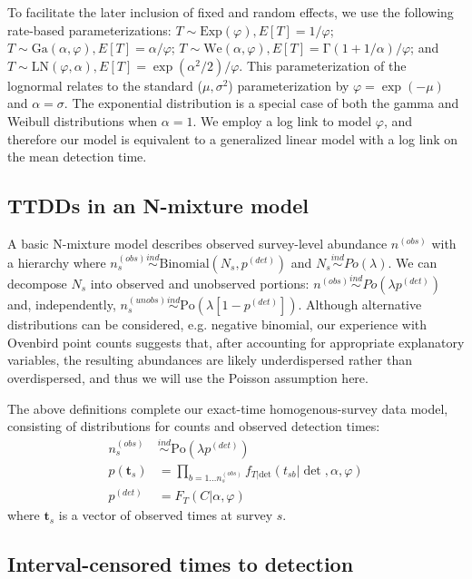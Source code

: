 \documentclass[12pt]{article}
\newcommand{\Exp}{\mbox{Exp}}
\newcommand{\Ga}{\mbox{Ga}}
\newcommand{\We}{\mbox{We}}
\newcommand{\LN}{\mbox{LN}}
\newcommand{\Po}{\mbox{Po}}
\newcommand{\pdet}{p^{(det)}}
\newcommand{\ind}{\stackrel{ind}{\sim}}
\newcommand{\dt}{\text{det}}
\newcommand{\nobs}{n^{(obs)}}
\begin{document}
To facilitate the later inclusion of fixed and random effects, we use the following rate-based parameterizations: $T\sim \Exp(\varphi), E[T]=1/\varphi$; $T\sim \Ga(\alpha,\varphi), E[T] = \alpha/\varphi$; $T\sim \We(\alpha,\varphi), E[T]=\mathrm{\Gamma}(1+1/\alpha)/\varphi$; and $T\sim \LN(\varphi,\alpha), E[T] = \exp(\alpha^2/2)/\varphi$.  
This parameterization of the lognormal relates to the standard ($\mu, \sigma^2$) parameterization by $\varphi = \exp(-\mu)$ and $\alpha = \sigma$.  %
The exponential distribution is a special case of both the gamma and Weibull distributions when $\alpha=1$. 
We employ a log link to model $\varphi$, and therefore our model is equivalent to a generalized linear model with a log link on the mean detection time.

\subsection{TTDDs in an N-mixture model}

A basic N-mixture model describes observed survey-level abundance $\nobs$ with a hierarchy where $\nobs_s \ind \mbox{Binomial}\left(N_{s}, \pdet\right)$ and $N_s \ind Po(\lambda)$.
We can decompose $N_{s}$ into observed and unobserved portions: $\nobs \ind Po(\lambda \pdet)$ and, independently, $n_{s}^{(unobs)} \ind \Po\left(\lambda[1-\pdet]\right)$.
Although alternative distributions can be considered, e.g. negative binomial, our experience with Ovenbird point counts suggests that, after accounting for appropriate explanatory variables, the resulting abundances are likely underdispersed rather than overdispersed, and thus we will use the Poisson assumption here. 

The above definitions complete our exact-time homogenous-survey data model, consisting of distributions for counts and observed detection times:
\begin{align}
\nobs_s &\ind \Po(\lambda \pdet) \nonumber\\
p(\textbf{t}_s) &= \prod\limits_{b=1 \dotso\nobs_s} f_{T|\dt}(t_{sb} | \det, \alpha, \varphi) \label{eq:simplemodel}\\
\pdet &= F_T(C|\alpha,\varphi) \nonumber
\end{align}
where $\textbf{t}_s$ is a vector of observed times at survey $s$.


\subsection{Interval-censored times to detection} \label{s:interval}
\end{document}
